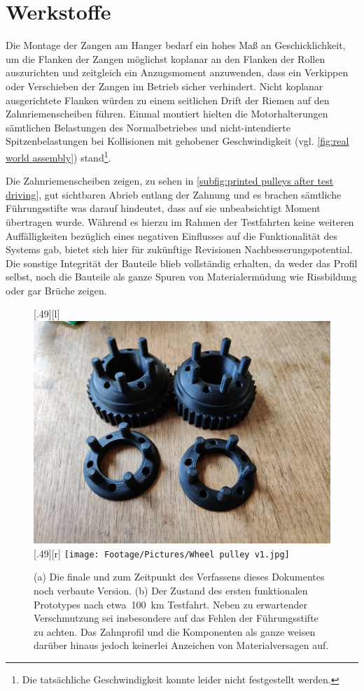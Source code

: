 	\section{Werkstoffe}\label{sec:material}
		Die Montage der Zangen am Hanger bedarf ein hohes Maß an Geschicklichkeit, um die Flanken der Zangen möglichst koplanar an den Flanken der Rollen auszurichten und zeitgleich ein Anzugsmoment anzuwenden, dass ein Verkippen oder Verschieben der Zangen im Betrieb sicher verhindert.
		Nicht koplanar ausgerichtete Flanken würden zu einem seitlichen Drift der Riemen auf den Zahnriemenscheiben führen.
		Einmal montiert hielten die Motorhalterungen sämtlichen Belastungen des Normalbetriebes und nicht-intendierte Spitzenbelastungen bei Kollisionen mit gehobener Geschwindigkeit (vgl. \cref{fig:real world assembly}) stand\footnote{\hspace{1mm}Die tatsächliche Geschwindigkeit konnte leider nicht festgestellt werden.}.\par\medskip
		Die Zahnriemenscheiben zeigen, zu sehen in \cref{subfig:printed pulleys after test driving}, gut sichtbaren Abrieb entlang der Zahnung und es brachen sämtliche Führungsstifte was darauf hindeutet, dass auf sie unbeabsichtigt Moment übertragen wurde.
		Während es hierzu im Rahmen der Testfahrten keine weiteren Auffälligkeiten bezüglich eines negativen Einflusses auf die Funktionalität des Systems gab, bietet sich hier für zukünftige Revisionen Nachbesserungspotential.
		Die sonstige Integrität der Bauteile blieb vollständig erhalten, da weder das Profil selbst, noch die Bauteile als ganze Spuren von Materialermüdung wie Rissbildung oder gar Brüche zeigen.
		\begin{figure}[h]
			\centering
			[.49\textwidth][l]{
				\includegraphics[angle=180, width=.49\textwidth]{Footage/Pictures/Wheel pulley v2.jpg}
			}
			[.49\textwidth][r]{
				\texttt{[image: Footage/Pictures/Wheel pulley v1.jpg]}
			}
			\caption[Vergleich der gedruckten Zahn- und Konterscheiben vor und nach mehreren Testfahrten]{(a) Die finale und zum Zeitpunkt des Verfassens dieses Dokumentes noch verbaute Version. (b) Der Zustand des ersten funktionalen Prototypes nach etwa~\qty{100}{\kilo\metre} Testfahrt. Neben zu erwartender Verschmutzung sei insbesondere auf das Fehlen der Führungsstifte zu achten. Das Zahnprofil und die Komponenten als ganze weisen darüber hinaus jedoch keinerlei Anzeichen von Materialversagen auf.}
			\label{fig:comparison printed parts used unused}
		\end{figure}

